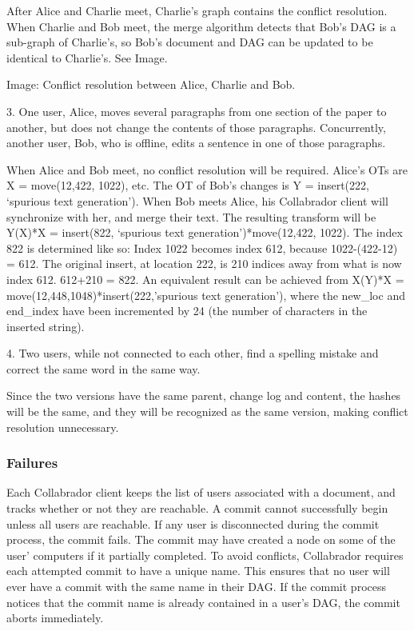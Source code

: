 \documentclass[11pt,titlepage]{article}
\begin{document}
After Alice and Charlie meet, Charlie’s graph contains the conflict resolution.  
When Charlie and Bob meet, the merge algorithm detects that Bob’s DAG is a sub-graph 
of Charlie’s, so Bob’s document and DAG can be updated to be identical to Charlie’s. 
See Image.

Image: Conflict resolution between Alice, Charlie and Bob.

3. One user, Alice, moves several paragraphs from one section of the paper to another,
but does not change the contents of those paragraphs. Concurrently, another user, Bob,
who is offline, edits a sentence in one of those paragraphs. 

When Alice and Bob meet, no conflict resolution will be required. Alice’s OTs are 
X = move(12,422, 1022), etc.  The OT of Bob’s changes is 
Y = insert(222, ‘spurious text generation’). When Bob meets Alice, his Collabrador
client will synchronize with her, and merge their text. The resulting transform will
be Y(X)*X = insert(822, ‘spurious text generation’)*move(12,422, 1022). The index
822 is determined like so: Index 1022 becomes index 612, because 1022-(422-12) = 612. 
The original insert, at location 222, is 210 indices away from what is now index 612. 
612+210 = 822. An equivalent result can be achieved from 
X(Y)*X = move(12,448,1048)*insert(222,’spurious text generation’), where the new_loc 
and end_index have been incremented by 24 (the number of characters in the inserted string).

4. Two users, while not connected to each other, find a spelling mistake and correct 
the same word in the same way. 
  
Since the two versions have the same parent, change log and content, 
the hashes will be the same, and they will be recognized as the same version,
making conflict resolution unnecessary.

\subsubsection{Failures}
Each Collabrador client keeps the list of users associated with a document,
and tracks whether or not they are reachable. A commit cannot successfully 
begin unless all users are reachable. If any user is disconnected during the 
commit process, the commit fails. The commit may have created a node on some 
of the user’ computers if it partially completed. To avoid conflicts, Collabrador
requires each attempted commit to have a unique name. This ensures that no
user will ever have a commit with the same name in their DAG. If the commit
process notices that the commit name is already contained in a user’s DAG, 
the commit aborts immediately. 
\end{document}
